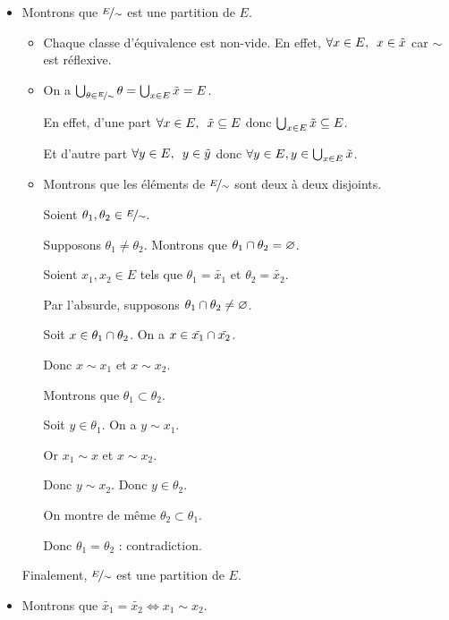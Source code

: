 \begin{dem}
\begin{itemize}
\item Montrons que \(\nicefrac{E}{\sim}\) est une partition de \(E\).

\begin{itemize}
\item Chaque classe d'équivalence est non-vide. En effet, \(\quantifs{\forall x\in E}x\in\tilde{x}\) car \(\sim\) est réflexive.

\item On a \(\bigcup_{\theta\in\nicefrac{E}{\sim}}\theta=\bigcup_{x\in E}\tilde{x}=E\).

En effet, d'une part \(\quantifs{\forall x\in E}\tilde{x}\subset E\) donc \(\bigcup_{x\in E}\tilde{x}\subseteq E\).

Et d'autre part \(\quantifs{\forall y\in E}y\in\tilde{y}\) donc \(\forall y\in E,y\in\bigcup_{x\in E}\tilde{x}\).

\item Montrons que les éléments de \(\nicefrac{E}{\sim}\) sont deux à deux disjoints.

Soient \(\theta_1,\theta_2\in\nicefrac{E}{\sim}\).

Supposons \(\theta_1\not=\theta_2\). Montrons que \(\theta_1\cap\theta_2=\varnothing\).

Soient \(x_1,x_2\in E\) tels que \(\theta_1=\tilde{x_1}\) et \(\theta_2=\tilde{x_2}\).

Par l'absurde, supposons \(\theta_1\cap\theta_2\not=\varnothing\).

Soit \(x\in\theta_1\cap\theta_2\). On a \(x\in\tilde{x_1}\cap\tilde{x_2}\).

Donc \(x\sim x_1\) et \(x\sim x_2\).

Montrons que \(\theta_1\subset\theta_2\).

Soit \(y\in\theta_1\). On a \(y\sim x_1\).

Or \(x_1\sim x\) et \(x\sim x_2\).

Donc \(y\sim x_2\). Donc \(y\in\theta_2\).

On montre de même \(\theta_2\subset\theta_1\).

Donc \(\theta_1=\theta_2\) : contradiction.
\end{itemize}

Finalement, \(\nicefrac{E}{\sim}\) est une partition de \(E\).

\item Montrons que \(\tilde{x_1}=\tilde{x_2}\iff x_1\sim x_2\).


\end{itemize}
\end{dem}
